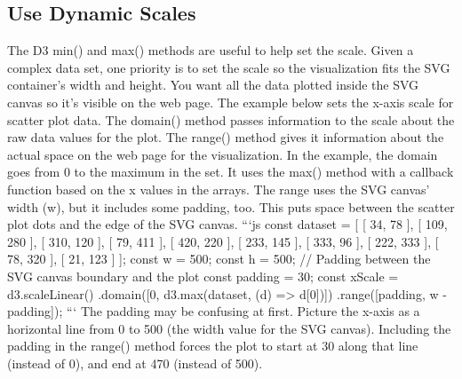 \documentclass{article}%
\begin{document}
\subsection{Use Dynamic Scales}%
\label{subsec:UseDynamicScales}%
The D3 min() and max() methods are useful to help set the scale.\newline%
Given a complex data set, one priority is to set the scale so the visualization fits the SVG container's width and height. You want all the data plotted inside the SVG canvas so it's visible on the web page.\newline%
The example below sets the x{-}axis scale for scatter plot data. The domain() method passes information to the scale about the raw data values for the plot. The range() method gives it information about the actual space on the web page for the visualization.\newline%
In the example, the domain goes from 0 to the maximum in the set. It uses the max() method with a callback function based on the x values in the arrays. The range uses the SVG canvas' width (w), but it includes some padding, too. This puts space between the scatter plot dots and the edge of the SVG canvas.\newline%
```js\newline%
const dataset = {[}\newline%
  {[} 34,    78 {]},\newline%
  {[} 109,   280 {]},\newline%
  {[} 310,   120 {]},\newline%
  {[} 79,    411 {]},\newline%
  {[} 420,   220 {]},\newline%
  {[} 233,   145 {]},\newline%
  {[} 333,   96 {]},\newline%
  {[} 222,   333 {]},\newline%
  {[} 78,    320 {]},\newline%
  {[} 21,    123 {]}\newline%
{]};\newline%
const w = 500;\newline%
const h = 500;\newline%
// Padding between the SVG canvas boundary and the plot\newline%
const padding = 30;\newline%
const xScale = d3.scaleLinear()\newline%
  .domain({[}0, d3.max(dataset, (d) => d{[}0{]}){]})\newline%
  .range({[}padding, w {-} padding{]});\newline%
```\newline%
The padding may be confusing at first. Picture the x{-}axis as a horizontal line from 0 to 500 (the width value for the SVG canvas). Including the padding in the range() method forces the plot to start at 30 along that line (instead of 0), and end at 470 (instead of 500).\newline%
\end{document}
